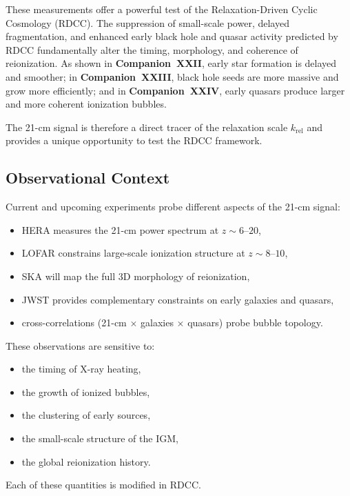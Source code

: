\documentclass[11pt,a4paper]{article}
\begin{document}
These measurements offer a powerful test of the Relaxation-Driven Cyclic Cosmology (RDCC).
The suppression of small-scale power, delayed fragmentation, and enhanced early black hole
and quasar activity predicted by RDCC fundamentally alter the timing, morphology, and
coherence of reionization. As shown in \textbf{Companion~XXII}, early star formation is delayed
and smoother; in \textbf{Companion~XXIII}, black hole seeds are more massive and grow more
efficiently; and in \textbf{Companion~XXIV}, early quasars produce larger and more coherent
ionization bubbles.

The 21-cm signal is therefore a direct tracer of the relaxation scale $k_{\mathrm{rel}}$ and provides a
unique opportunity to test the RDCC framework.

\subsection{Observational Context}

Current and upcoming experiments probe different aspects of the 21-cm signal:
\begin{itemize}
\item HERA measures the 21-cm power spectrum at $z \sim 6$–$20$,
\item LOFAR constrains large-scale ionization structure at $z \sim 8$–$10$,
\item SKA will map the full 3D morphology of reionization,
\item JWST provides complementary constraints on early galaxies and quasars,
\item cross-correlations (21-cm $\times$ galaxies $\times$ quasars) probe bubble topology.
\end{itemize}

These observations are sensitive to:
\begin{itemize}
\item the timing of X-ray heating,
\item the growth of ionized bubbles,
\item the clustering of early sources,
\item the small-scale structure of the IGM,
\item the global reionization history.
\end{itemize}

Each of these quantities is modified in RDCC.

\end{document}
